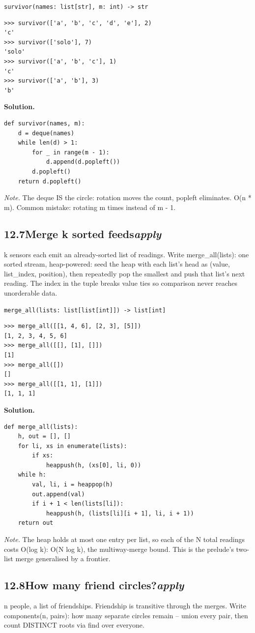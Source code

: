 \documentclass[10pt,letterpaper]{book}
\begin{document}
\noindent\texttt{survivor(names: list[str], m: int) -> str}
\begin{lstlisting}[style=ex]
>>> survivor(['a', 'b', 'c', 'd', 'e'], 2)
'c'
>>> survivor(['solo'], 7)
'solo'
>>> survivor(['a', 'b', 'c'], 1)
'c'
>>> survivor(['a', 'b'], 3)
'b'
\end{lstlisting}
\noindent\textbf{Solution.}
\begin{lstlisting}[style=code]
def survivor(names, m):
    d = deque(names)
    while len(d) > 1:
        for _ in range(m - 1):
            d.append(d.popleft())
        d.popleft()
    return d.popleft()
\end{lstlisting}
\noindent\textit{Note.} The deque IS the circle: rotation moves the count, popleft eliminates. O(n * m). Common mistake: rotating m times instead of m - 1.

\subsection*{12.7\quad Merge k sorted feeds\hfill\textnormal{\textit{apply}}}
k sensors each emit an already-sorted list of readings. Write merge\_all(lists): one sorted stream, heap-powered: seed the heap with each list's head as (value, list\_index, position), then repeatedly pop the smallest and push that list's next reading. The index in the tuple breaks value ties so comparison never reaches unorderable data.

\noindent\texttt{merge\_all(lists: list[list[int]]) -> list[int]}
\begin{lstlisting}[style=ex]
>>> merge_all([[1, 4, 6], [2, 3], [5]])
[1, 2, 3, 4, 5, 6]
>>> merge_all([[], [1], []])
[1]
>>> merge_all([])
[]
>>> merge_all([[1, 1], [1]])
[1, 1, 1]
\end{lstlisting}
\noindent\textbf{Solution.}
\begin{lstlisting}[style=code]
def merge_all(lists):
    h, out = [], []
    for li, xs in enumerate(lists):
        if xs:
            heappush(h, (xs[0], li, 0))
    while h:
        val, li, i = heappop(h)
        out.append(val)
        if i + 1 < len(lists[li]):
            heappush(h, (lists[li][i + 1], li, i + 1))
    return out
\end{lstlisting}
\noindent\textit{Note.} The heap holds at most one entry per list, so each of the N total readings costs O(log k): O(N log k), the multiway-merge bound. This is the prelude's two-list merge generalised by a frontier.

\subsection*{12.8\quad How many friend circles?\hfill\textnormal{\textit{apply}}}
n people, a list of friendships. Friendship is transitive through the merges. Write components(n, pairs): how many separate circles remain -- union every pair, then count DISTINCT roots via find over everyone.
\end{document}
